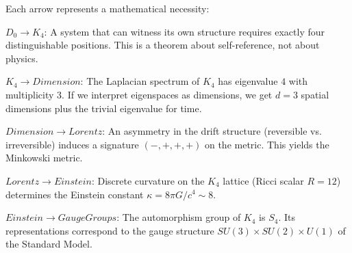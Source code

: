 \documentclass[11pt,a4paper]{book}
\def\mathrm#1{#1}%
\def\text#1{#1}%
\begin{document}
\begin{center}
\end{center}

Each arrow represents a mathematical necessity:

\textbf{$D_0 \to K_4$}: A system that can witness its own structure requires exactly four distinguishable positions. This is a theorem about self-reference, not about physics.

\textbf{$K_4 \to \text{Dimension}$}: The Laplacian spectrum of $K_4$ has eigenvalue $4$ with multiplicity $3$. If we interpret eigenspaces as dimensions, we get $d=3$ spatial dimensions plus the trivial eigenvalue for time.

\textbf{$\text{Dimension} \to \text{Lorentz}$}: An asymmetry in the drift structure (reversible vs. irreversible) induces a signature $(-,+,+,+)$ on the metric. This yields the Minkowski metric.

\textbf{$\text{Lorentz} \to \text{Einstein}$}: Discrete curvature on the $K_4$ lattice (Ricci scalar $R=12$) determines the Einstein constant $\kappa = 8\pi G / c^4 \sim 8$.

\textbf{$\text{Einstein} \to \text{Gauge Groups}$}: The automorphism group of $K_4$ is $S_4$. Its representations correspond to the gauge structure $SU(3) \times SU(2) \times U(1)$ of the Standard Model.
\end{document}
